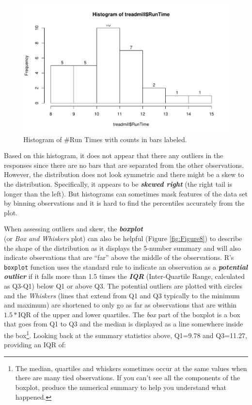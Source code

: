 \documentclass[]{article}
\let\rmarkdownfootnote\footnote%
\def\footnote{\protect\rmarkdownfootnote}
\begin{document}
\begin{figure}[htbp]
\centering
\includegraphics{01-preface_files/figure-latex/Figure7-1.pdf}
\caption{\label{fig:Figure7}Histogram of \#Run Times with counts in bars labeled.}
\end{figure}

Based on this histogram, it does not appear that there any outliers in
the responses since there are no bars that are separated from the other
observations. However, the distribution does not look symmetric and
there might be a skew to the distribution. Specifically, it appears to
be \textbf{\emph{skewed right}} (the right tail is longer than the
left). But histograms can sometimes mask features of the data set by
binning observations and it is hard to find the percentiles accurately
from the plot.

When assessing outliers and skew, the \textbf{\emph{boxplot}}\\
(or \emph{Box and Whiskers} plot) can also be helpful (Figure
\ref{fig:Figure8}) to describe the shape of the distribution as it
displays the 5-number summary and will also indicate observations that
are ``far'' above the middle of the observations. R's \texttt{boxplot}
function uses the standard rule to indicate an observation as a
\textbf{\emph{potential outlier}} if it falls more than 1.5 times the
\textbf{\emph{IQR}} (Inter-Quartile Range, calculated as Q3-Q1) below Q1
or above Q3. The potential outliers are plotted with circles and the
\emph{Whiskers} (lines that extend from Q1 and Q3 typically to the
minimum and maximum) are shortened to only go as far as observations
that are within \(1.5*\)IQR of the upper and lower quartiles. The
\emph{box} part of the boxplot is a box that goes from Q1 to Q3 and the
median is displayed as a line somewhere inside the box\footnote{The
  median, quartiles and whiskers sometimes occur at the same values when
  there are many tied observations. If you can't see all the components
  of the boxplot, produce the numerical summary to help you understand
  what happened.}. Looking back at the summary statistics above, Q1=9.78
and Q3=11.27, providing an IQR of:
\end{document}
